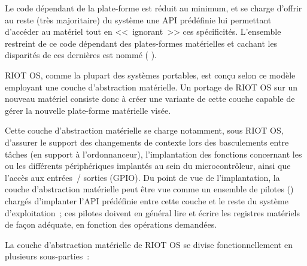 Le code dépendant de la plate-forme est réduit au minimum, et se charge
d'offrir au reste (très majoritaire) du système une API prédéfinie
lui permettant d'accéder au matériel tout en <<~ignorant~>> ces
spécificités. L'ensemble restreint de ce code dépendant des plates-formes
matérielles et cachant les disparités de ces dernières est nommé
 ( ).

\smallskip

RIOT OS, comme la plupart des systèmes portables, est conçu selon ce modèle
employant une couche d'abstraction matérielle. Un portage de RIOT OS sur un
nouveau matériel consiste donc à créer une variante de cette couche capable
de gérer la nouvelle plate-forme matérielle visée.

Cette couche d'abstraction matérielle se charge notamment, sous RIOT OS,
d'assurer le support des changements de contexte lors des basculements entre
tâches (en support à l'ordonnanceur), l'implantation des fonctions concernant
les  ou les différents périphériques implantés au sein du
microcontrôleur, ainsi que l'accès aux entrées~/ sorties (GPIO). Du point
de vue de l'implantation, la couche d'abstraction matérielle peut être vue
comme un ensemble de pilotes () chargés d'implanter l'API
prédéfinie entre cette couche et le reste du système d'exploitation~;
ces pilotes doivent en général lire et écrire les registres matériels
de façon adéquate, en fonction des opérations demandées.

\smallskip

La couche d'abstraction matérielle de RIOT OS se divise fonctionnellement
en plusieurs sous-parties~:

